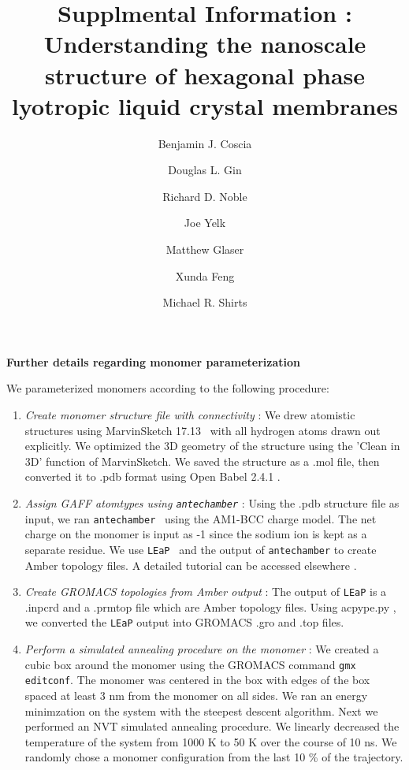 \documentclass{article}
\title{Supplmental Information : Understanding the nanoscale structure of hexagonal phase lyotropic liquid crystal membranes}
\author{Benjamin J. Coscia \and Douglas L. Gin \and Richard D. Noble \and Joe Yelk \and Matthew Glaser \and Xunda Feng \and Michael R. Shirts}
\begin{document}
  
  \graphicspath{{./figures/}}  %
  \maketitle

  \noindent
  \begingroup
	\fontsize{14pt}{14pt}\selectfont
	\textbf{Further details regarding monomer parameterization} 
  \endgroup
 
  \vspace{1em}
  We parameterized monomers according to the following procedure:
  \begin{enumerate}
	\item \textit{Create monomer structure file with connectivity} : We
	drew atomistic structures using MarvinSketch
	17.13~\cite{chemaxon_marvinsketch_2017} with all hydrogen atoms drawn out
	explicitly. We optimized the 3D geometry of the structure using the 'Clean in
	3D' function of MarvinSketch.  We saved the structure as a .mol file, then
	converted it to .pdb format using Open Babel 2.4.1
	\cite{oboyle_open_2011,noauthor_open_nodate}. 
	\item \textit{Assign GAFF atomtypes using \texttt{antechamber}} : Using
	the .pdb structure file as input, we ran
	\texttt{antechamber}~\cite{wang_automatic_2006} using the AM1-BCC charge model.
	The net charge on the monomer is input as -1 since the sodium ion is kept as 
	a separate residue. We use \texttt{LEaP}~\cite{case_ambertools_nodate} and the
	output of \texttt{antechamber} to create Amber topology files. A detailed
	tutorial can be accessed elsewhere \cite{walker_antechamber_nodate}.
	\item \textit{Create GROMACS topologies from Amber output} : The output
	of \texttt{LEaP} is a .inpcrd and a .prmtop file which are Amber topology
	files. Using acpype.py \cite{sousa_da_silva_acpype_2012}, we converted the
	\texttt{LEaP} output into GROMACS .gro and .top files. 
	\item \textit{Perform a simulated annealing procedure on the monomer} :
	We created a cubic box around the monomer using the GROMACS command \texttt{gmx
	editconf}. The monomer was centered in the box with edges of the
	box spaced at least 3 nm from the monomer on all sides. We ran an energy minimzation
	on the system with the steepest descent algorithm. Next we performed an NVT
	simulated annealing procedure. We linearly decreased the temperature of the
	system from 1000 K to 50 K over the course of 10 ns. We randomly chose a monomer
	configuration from the last 10 \% of the trajectory. 

\end{enumerate}
\end{document}
